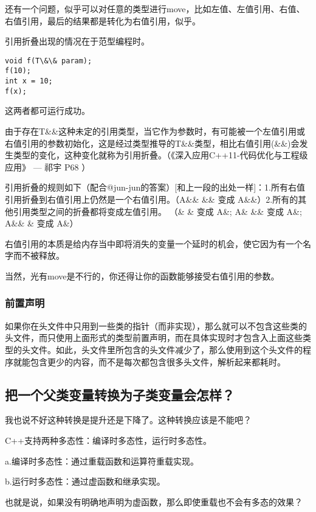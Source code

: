 还有一个问题，似乎可以对任意的类型进行move，比如左值、左值引用、右值、右值引用，最后的结果都是转化为右值引用，似乎。

引用折叠出现的情况在于范型编程时。

\begin{lstlisting}
void f(T\&\& param);
f(10);
int x = 10;
f(x);
\end{lstlisting}
这两者都可运行成功。

由于存在T\&\&这种未定的引用类型，当它作为参数时，有可能被一个左值引用或右值引用的参数初始化，这是经过类型推导的T\&\&类型，相比右值引用(\&\&)会发生类型的变化，这种变化就称为引用折叠。（《深入应用C++11-代码优化与工程级应用》 --- 祁宇 P68 ）

引用折叠的规则如下（配合@jun-jun的答案）[和上一段的出处一样]：1.所有右值引用折叠到右值引用上仍然是一个右值引用。（A\&\& \&\& 变成 A\&\&）2.所有的其他引用类型之间的折叠都将变成左值引用。 （\& \& 变成 A\&; A\& \&\& 变成 A\&; A\&\& \& 变成 A\&）

右值引用的本质是给内存当中即将消失的变量一个延时的机会，使它因为有一个名字而不被释放。

当然，光有move是不行的，你还得让你的函数能够接受右值引用的参数。
\subsubsection{前置声明}
如果你在头文件中只用到一些类的指针（而非实现），那么就可以不包含这些类的头文件，而只使用上面形式的类型前置声明，而在具体实现时才包含入上面这些类型的头文件。如此，头文件里所包含的头文件减少了，那么使用到这个头文件的程序就能包含更少的内容，而不是每次都包含很多头文件，解析起来都耗时。
\subsection{把一个父类变量转换为子类变量会怎样？}
我也说不好这种转换是提升还是下降了。这种转换应该是不能吧？

C++支持两种多态性：编译时多态性，运行时多态性。 

a.编译时多态性：通过重载函数和运算符重载实现。 

b.运行时多态性：通过虚函数和继承实现。

也就是说，如果没有明确地声明为虚函数，那么即使重载也不会有多态的效果？
